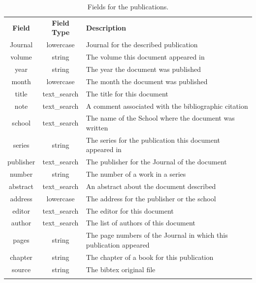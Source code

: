 \begin{table}
    \centering
    \begin{tabular*}{0.8\textwidth}{@{\extracolsep{\fill}} | c | c | p{} |}
      \hhline{|-|-|-|}
      \textbf{Field} & \textbf{Field Type} & \textbf{Description} \\ \hhline{|=|=|=|}
      Journal & lowercase &  Journal for the described publication \\ \hhline{|-|-|-|}
      volume & string & The volume this document appeared in \\ \hhline{|-|-|-|}
      year & string & The year the document was published \\ \hhline{|-|-|-|}
      month & lowercase & The month the document was published \\ \hhline{|-|-|-|}
      title & text\_search & The title for this document \\ \hhline{|-|-|-|}
      note & text\_search & A comment associated with the bibliographic citation \\ \hhline{|-|-|-|}
      school & text\_search & The name of the School where the document was written \\ \hhline{|-|-|-|}
      series & string & The series for the publication this document appeared in \\ \hhline{|-|-|-|}
      publisher & text\_search & The publisher for the Journal of the document \\ \hhline{|-|-|-|}
      number & string & The number of a work in a series \\ \hhline{|-|-|-|}
      abstract & text\_search & An abstract about the document described \\ \hhline{|-|-|-|}
      address & lowercase & The address for the publisher or the school \\ \hhline{|-|-|-|}
      editor & text\_search & The editor for this document \\ \hhline{|-|-|-|}
      author & text\_search & The list of authors of this document \\ \hhline{|-|-|-|}
      pages & string & The page numbers of the Journal in which this publication appeared \\ \hhline{|-|-|-|}
      chapter & string & The chapter of a book for this publication \\ \hhline{|-|-|-|}
      source & string & The bibtex original file \\ \hhline{|-|-|-|}
      \end{tabular*}
    \caption{Fields for the publications.}
    \label{tab:schema-gsifields-pubs}
\end{table}

